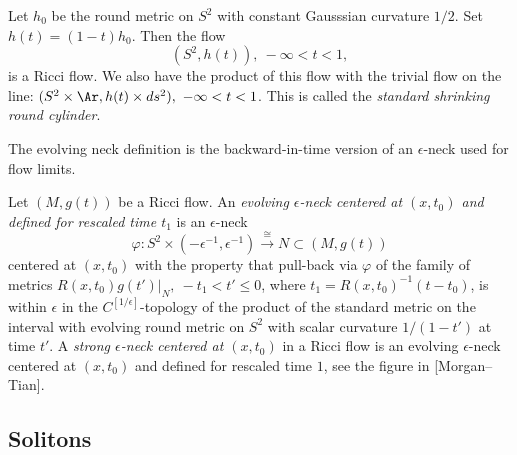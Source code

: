 \begin{example}\label{ex:shrinking-round-cylinder}

Let $h_0$ be the round metric on $S^2$ with constant Gausssian
curvature $1/2$. Set $h(t)=(1-t)h_0$. Then the flow $$(S^2,h(t)),\
-\infty<t<1,$$ is a Ricci flow. We also have the product of this flow
with the trivial flow on the line: $(S^2\times \Ar,h(t)\times
ds^2),\ -\infty<t<1$. This is called the {\em standard shrinking
round cylinder}.
\end{example}

The evolving neck definition is the backward-in-time version of an
$\epsilon$-neck used for flow limits.


\begin{definition}\label{def:evolving-epsilon-neck}
\uses{def:epsilon-neck}
\label{strongepsneck}

Let $(M,g(t))$ be a Ricci flow. An {\em evolving $\epsilon$-neck
centered at $(x,t_0)$ and defined for rescaled time
$t_1$} is an $\epsilon$-neck
$$\varphi\colon S^2\times
(-\epsilon^{-1},\epsilon^{-1})\xrightarrow{\cong}
N\subset (M,g(t))$$ centered at $(x,t_0)$ with the property that
pull-back via $\varphi$ of the family of metrics $R(x,t_0)g(t')|_N,\
-t_1< t'\le 0$, where $t_1=R(x,t_0)^{-1}(t-t_0)$, is within
$\epsilon$ in the $C^{[1/\epsilon]}$-topology of the product of the
standard metric on the interval with evolving round metric on $S^2$
with scalar curvature $1/(1-t')$ at time $t'$. A {\em strong
$\epsilon$-neck centered at
$(x,t_0)$} in a Ricci flow is an
evolving $\epsilon$-neck centered at $(x,t_0)$ and defined for
rescaled time $1$, see the figure in [Morgan--Tian].
\end{definition}


\subsection{Solitons}

